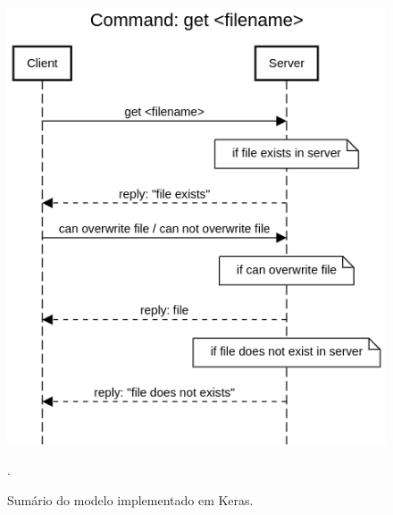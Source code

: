 \documentclass[conference]{IEEEtran}
\begin{document}
\begin{figure}[htbp]
\centering
\centerline{\includegraphics[scale=0.4]{diagrams/Command_get_filename.png}}
\caption{Sumário do modelo implementado em Keras.}.
\label{summary}
\end{figure}
\end{document}
